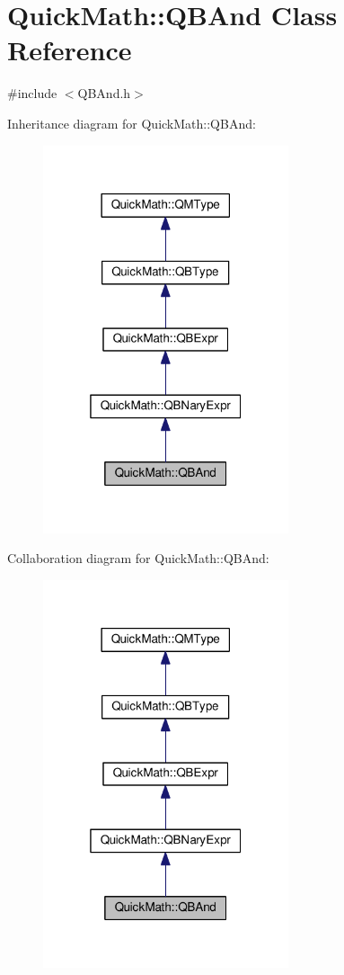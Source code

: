 \hypertarget{classQuickMath_1_1QBAnd}{}\section{Quick\+Math\+:\+:Q\+B\+And Class Reference}
\label{classQuickMath_1_1QBAnd}


{\ttfamily \#include $<$Q\+B\+And.\+h$>$}



Inheritance diagram for Quick\+Math\+:\+:Q\+B\+And\+:
\nopagebreak
\begin{figure}[H]
\begin{center}
\leavevmode
\includegraphics[width=205pt]{classQuickMath_1_1QBAnd__inherit__graph}
\end{center}
\end{figure}


Collaboration diagram for Quick\+Math\+:\+:Q\+B\+And\+:
\nopagebreak
\begin{figure}[H]
\begin{center}
\leavevmode
\includegraphics[width=205pt]{classQuickMath_1_1QBAnd__coll__graph}
\end{center}
\end{figure}
